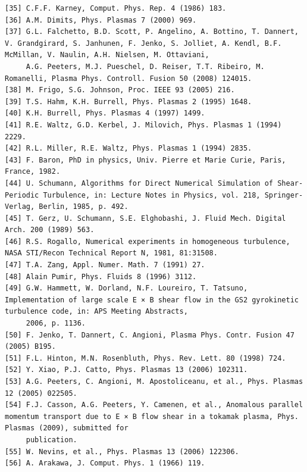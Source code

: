 \documentclass[a4paper]{article}
\newcommand{\gkwpagefont}{\fontsize{6.0pt}{7.55pt}\selectfont}
\begin{document}
\begin{Verbatim}[fontsize=\gkwpagefont]
[35] C.F.F. Karney, Comput. Phys. Rep. 4 (1986) 183.
[36] A.M. Dimits, Phys. Plasmas 7 (2000) 969.
[37] G.L. Falchetto, B.D. Scott, P. Angelino, A. Bottino, T. Dannert, V. Grandgirard, S. Janhunen, F. Jenko, S. Jolliet, A. Kendl, B.F. McMillan, V. Naulin, A.H. Nielsen, M. Ottaviani,
     A.G. Peeters, M.J. Pueschel, D. Reiser, T.T. Ribeiro, M. Romanelli, Plasma Phys. Controll. Fusion 50 (2008) 124015.
[38] M. Frigo, S.G. Johnson, Proc. IEEE 93 (2005) 216.
[39] T.S. Hahm, K.H. Burrell, Phys. Plasmas 2 (1995) 1648.
[40] K.H. Burrell, Phys. Plasmas 4 (1997) 1499.
[41] R.E. Waltz, G.D. Kerbel, J. Milovich, Phys. Plasmas 1 (1994) 2229.
[42] R.L. Miller, R.E. Waltz, Phys. Plasmas 1 (1994) 2835.
[43] F. Baron, PhD in physics, Univ. Pierre et Marie Curie, Paris, France, 1982.
[44] U. Schumann, Algorithms for Direct Numerical Simulation of Shear-Periodic Turbulence, in: Lecture Notes in Physics, vol. 218, Springer-Verlag, Berlin, 1985, p. 492.
[45] T. Gerz, U. Schumann, S.E. Elghobashi, J. Fluid Mech. Digital Arch. 200 (1989) 563.
[46] R.S. Rogallo, Numerical experiments in homogeneous turbulence, NASA STI/Recon Technical Report N, 1981, 81:31508.
[47] T.A. Zang, Appl. Numer. Math. 7 (1991) 27.
[48] Alain Pumir, Phys. Fluids 8 (1996) 3112.
[49] G.W. Hammett, W. Dorland, N.F. Loureiro, T. Tatsuno, Implementation of large scale E × B shear flow in the GS2 gyrokinetic turbulence code, in: APS Meeting Abstracts,
     2006, p. 1136.
[50] F. Jenko, T. Dannert, C. Angioni, Plasma Phys. Contr. Fusion 47 (2005) B195.
[51] F.L. Hinton, M.N. Rosenbluth, Phys. Rev. Lett. 80 (1998) 724.
[52] Y. Xiao, P.J. Catto, Phys. Plasmas 13 (2006) 102311.
[53] A.G. Peeters, C. Angioni, M. Apostoliceanu, et al., Phys. Plasmas 12 (2005) 022505.
[54] F.J. Casson, A.G. Peeters, Y. Camenen, et al., Anomalous parallel momentum transport due to E × B flow shear in a tokamak plasma, Phys. Plasmas (2009), submitted for
     publication.
[55] W. Nevins, et al., Phys. Plasmas 13 (2006) 122306.
[56] A. Arakawa, J. Comput. Phys. 1 (1966) 119.
\end{Verbatim}
\end{document}
